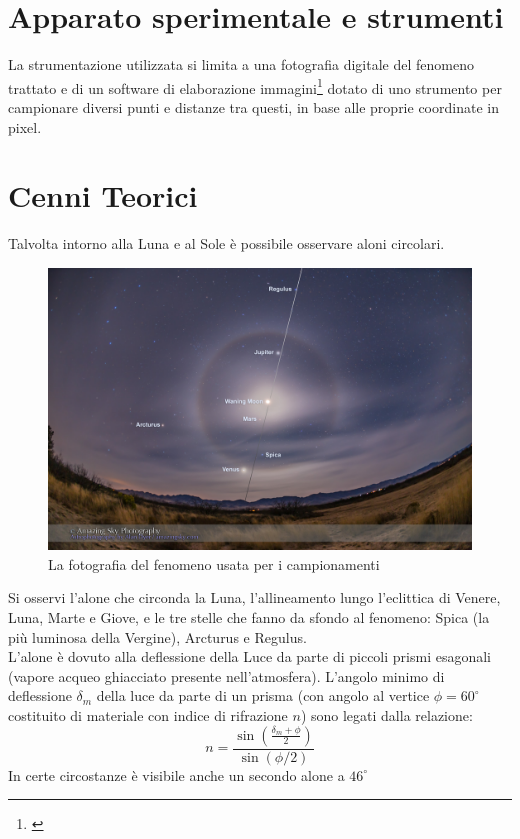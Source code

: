 \documentclass{report}[a4paper,11pt]
\begin{document}
\section{Apparato sperimentale e strumenti}
La strumentazione utilizzata si limita a una fotografia digitale del fenomeno trattato e di un software di elaborazione immagini\footnote{\cite{gimp}} dotato di uno strumento per campionare diversi punti e distanze tra questi, in base alle proprie coordinate in pixel.
\section{Cenni Teorici}
Talvolta intorno alla Luna e al Sole \`e possibile osservare aloni circolari.
\begin{figure}[htb!]
  \centering
    \includegraphics[width=\linewidth]{./figs/lunar-halo.jpg}
  \caption{La fotografia del fenomeno usata per i campionamenti}
\end{figure}
Si osservi l'alone che circonda la Luna, l'allineamento lungo l'eclittica di Venere, Luna, Marte e Giove, e le tre stelle che fanno da sfondo al fenomeno: Spica (la pi\`u luminosa della Vergine), Arcturus e Regulus.\\
L'alone \`e dovuto alla deflessione della Luce da parte di piccoli prismi esagonali (vapore acqueo ghiacciato presente nell'atmosfera). 
L'angolo minimo di deflessione $\delta_m$ della luce da parte di un prisma (con angolo al vertice $\phi = 60^\circ$ costituito di materiale con indice di rifrazione $n$) sono legati dalla relazione:
\begin{equation}\label{eq:prism}
n = \frac{\sin\left(\frac{\delta_m + \phi}{2}\right)}{\sin (\phi/2)}
\end{equation} 
In certe circostanze \`e visibile anche un secondo alone a $46^\circ$
\end{document}
